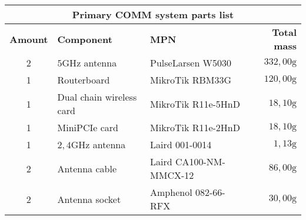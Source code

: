 \begin{tabular}{|c|l|l|r|}
	\hline
	\multicolumn{4}{|c|}{\textbf{Primary COMM system parts list}} \\
	\hline
 	\textbf{Amount} & \textbf{Component} & \textbf{MPN} & \textbf{Total mass} \\
 	\hline
 	2 & $5\mathrm{GHz}$ antenna & PulseLarsen W5030 & $332,00\mathrm{g}$ \\
 	1 & Routerboard & MikroTik RBM33G  & $120,00\mathrm{g}$ \\
 	1 & Dual chain wireless card & MikroTik R11e-5HnD & $18,10\mathrm{g}$ \\%
 	1 & MiniPCIe card & MikroTik R11e-2HnD & $18,10\mathrm{g}$ \\%
 	1 & $2,4\mathrm{GHz}$ antenna & Laird 001-0014 & $1,13\mathrm{g}$ \\
 	2 & Antenna cable & Laird CA100-NM-MMCX-12 & $86,00\mathrm{g}$ \\
	2 & Antenna socket & Amphenol 082-66-RFX & $30,00\mathrm{g}$ \\
 	\hline
\end{tabular}